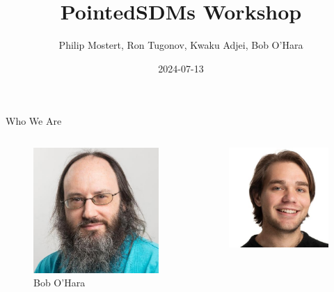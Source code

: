 \documentclass[
  ignorenonframetext,
]{beamer}
\title{PointedSDMs Workshop}
\author{Philip Mostert, Ron Tugonov, Kwaku Adjei, Bob O'Hara}
\date{2024-07-13}
\institute{ISEC 2024, Swansea, Wales}
\begin{document}
\frame{\titlepage}

\begin{frame}
\begin{block}{Who We Are}
\label{who-we-are}
\begin{columns}[T]
\begin{column}{0.25\textwidth}
\begin{figure}[H]

{\centering \includegraphics{Images/BobOH.jpg}

}

\caption{Bob O'Hara}

\end{figure}%
\end{column}

\begin{column}{0.25\textwidth}
\begin{figure}[H]

{\centering \includegraphics{Images/Philip.jpg}

}
\end{figure}
\end{column}
\end{columns}
\end{block}
\end{frame}
\end{document}
